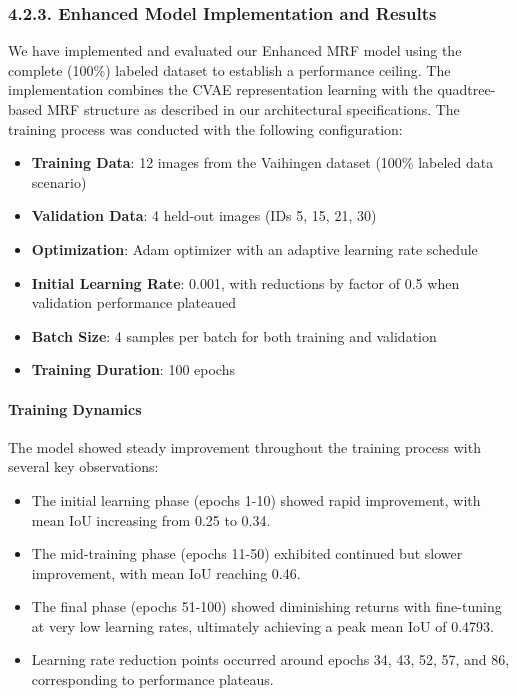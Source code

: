 \documentclass[conference]{IEEEtran}
\begin{document}
\subsubsection*{4.2.3. Enhanced Model Implementation and Results}

We have implemented and evaluated our Enhanced MRF model using the complete (100\%) labeled dataset to establish a performance ceiling. The implementation combines the CVAE representation learning with the quadtree-based MRF structure as described in our architectural specifications. The training process was conducted with the following configuration:

\begin{itemize}
    \item \textbf{Training Data}: 12 images from the Vaihingen dataset (100\% labeled data scenario)
    \item \textbf{Validation Data}: 4 held-out images (IDs 5, 15, 21, 30)
    \item \textbf{Optimization}: Adam optimizer with an adaptive learning rate schedule
    \item \textbf{Initial Learning Rate}: 0.001, with reductions by factor of 0.5 when validation performance plateaued
    \item \textbf{Batch Size}: 4 samples per batch for both training and validation
    \item \textbf{Training Duration}: 100 epochs
\end{itemize}

\paragraph{Training Dynamics}
The model showed steady improvement throughout the training process with several key observations:

\begin{itemize}
    \item The initial learning phase (epochs 1-10) showed rapid improvement, with mean IoU increasing from 0.25 to 0.34.
    \item The mid-training phase (epochs 11-50) exhibited continued but slower improvement, with mean IoU reaching 0.46.
    \item The final phase (epochs 51-100) showed diminishing returns with fine-tuning at very low learning rates, ultimately achieving a peak mean IoU of 0.4793.
    \item Learning rate reduction points occurred around epochs 34, 43, 52, 57, and 86, corresponding to performance plateaus.
\end{itemize}
\end{document}
